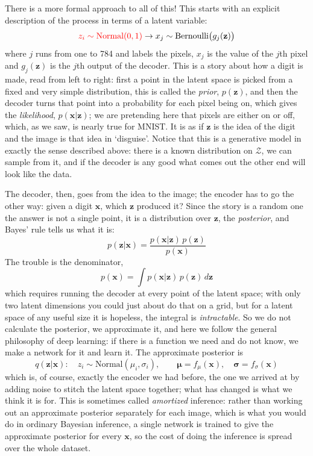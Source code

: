\documentclass[12pt]{article}
\begin{document}
There is a more formal approach to all of this! This starts with an explicit description of the process in terms of a latent variable:
\begin{equation}
  \textcolor{red}{z_i\sim\text{Normal}(0,1)} \rightarrow x_j\sim\text{Bernoulli}\big(g_j(\mathbf{z})\big)
\end{equation}
where $j$ runs from one to 784 and labels the pixels, $x_j$ is the
value of the $j$th pixel and $g_j(\mathbf{z})$ is the $j$th output of
the decoder. This is a story about how a digit is made, read from left
to right: first a point in the latent space is picked from a fixed and
very simple distribution, this is called the \textsl{prior},
$p(\mathbf{z})$, and then the decoder turns that point into a
probability for each pixel being on, which gives the
\textsl{likelihood}, $p(\mathbf{x}|\mathbf{z})$; we are pretending
here that pixels are either on or off, which, as we saw, is nearly
true for MNIST. It is as if $\mathbf{z}$ is the idea of the digit and
the image is that idea in `disguise'. Notice that this is a generative
model in exactly the sense described above: there is a known
distribution on $\mathcal{Z}$, we can sample from it, and if the
decoder is any good what comes out the other end will look like the
data.

The decoder, then, goes from the idea to the image; the encoder has to
go the other way: given a digit $\mathbf{x}$, which $\mathbf{z}$
produced it? Since the story is a random one the answer is not a
single point, it is a distribution over $\mathbf{z}$, the
\textsl{posterior}, and Bayes' rule tells us what it is:
\begin{equation}
  p(\mathbf{z}|\mathbf{x})=\frac{p(\mathbf{x}|\mathbf{z})\,p(\mathbf{z})}{p(\mathbf{x})}
\end{equation}
The trouble is the denominator,
\begin{equation}
  p(\mathbf{x})=\int p(\mathbf{x}|\mathbf{z})\,p(\mathbf{z})\,d\mathbf{z}
\end{equation}
which requires running the decoder at every point of the latent space;
with only two latent dimensions you could just about do that on a
grid, but for a latent space of any useful size it is hopeless, the
integral is \textsl{intractable}. So we do not calculate the
posterior, we approximate it, and here we follow the general
philosophy of deep learning: if there is a function we need and do not
know, we make a network for it and learn it. The approximate posterior
is
\begin{equation}
  q(\mathbf{z}|\mathbf{x}):\quad z_i\sim\text{Normal}(\mu_i,\sigma_i),\qquad \boldsymbol{\mu}=f_\mu(\mathbf{x}),\quad \boldsymbol{\sigma}=f_\sigma(\mathbf{x})
\end{equation}
which is, of course, exactly the encoder we had before, the one we
arrived at by adding noise to stitch the latent space together; what
has changed is what we think it is for. This is sometimes called
\textsl{amortized} inference: rather than working out an approximate
posterior separately for each image, which is what you would do in
ordinary Bayesian inference, a single network is trained to give the
approximate posterior for every $\mathbf{x}$, so the cost of doing the
inference is spread over the whole dataset.
\end{document}
